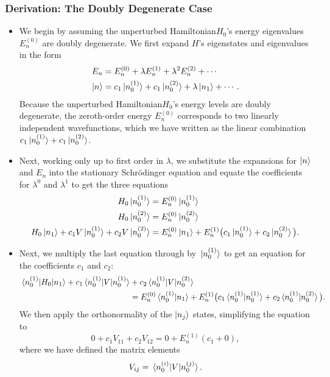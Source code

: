 \documentclass[11pt, a4paper]{article}
\newcommand{\Schro}{Schr\"{o}dinger\xspace}
\newcommand{\Ham}{Hamiltonian\xspace}
\begin{document}
\subsubsection{Derivation: The Doubly Degenerate Case}
\begin{itemize}
    \item We begin by assuming the unperturbed \Ham $ H_{0} $'s energy eigenvalues $ E_{n}^{(0)} $ are doubly degenerate. We first expand $ H $'s eigenstates and eigenvalues in the form
    \begin{align*}
        E_{n} &= E_{n}^{(0)} + \lambda E_{n}^{(1)} + \lambda^{2} E_{n}^{(2)} + \cdots\\
        \ket{n} &= c_{1}\ket*{n_{0}^{(1)}} + c_{1}\ket*{n_{0}^{(2)}} + \lambda \ket{n_{1}} +  \cdots.
    \end{align*}
    Because the unperturbed \Ham $ H_{0} $'s energy levels are doubly degenerate, the zeroth-order energy $ E_{n}^{(0)} $ corresponds to two linearly independent wavefunctions, which we have written as the linear combination $ c_{1}\ket*{n_{0}^{(1)}} + c_{1}\ket*{n_{0}^{(2)}} $. 

    \item Next, working only up to first order in $ \lambda $, we substitute the expansions for $ \ket{n} $ and $ E_{n} $ into the stationary \Schro equation and equate the coefficients for $ \lambda^{0} $ and $ \lambda^{1} $ to get the three equations
    \begin{align*}
        H_{0} \ket*{n_{0}^{(1)}} &= E_{n}^{(0)} \ket*{n_{0}^{(1)}}\\
        H_{0} \ket*{n_{0}^{(2)}} &= E_{n}^{(0)} \ket*{n_{0}^{(2)}}\\
        H_{0}\ket{n_{1}} + c_{1}V \ket*{n_{0}^{(1)}} + c_{2}V \ket*{n_{0}^{(2)}} &= E_{n}^{(0)} \ket{n_{1}} + E_{n}^{(1)} \big( c_{1}\ket*{n_{0}^{(1)}} + c_{2}\ket*{n_{0}^{(2)}} \big).
    \end{align*}
    
    \item Next, we multiply the last equation through by $ \ket*{n_{0}^{(1)}} $ to get an equation for the coefficients $ c_{1} $ and $ c_{2} $:
    \begin{align*}
        \mel*{n_{0}^{(1)}}{H_{0}}{n_{1}} + c_{1}\mel*{n_{0}^{(1)}}{V}{n_{0}^{(1)}} &+ c_{2}\mel*{n_{0}^{(1)}}{V}{n_{0}^{(2)}} \\
        & = E_{n}^{(0)} \braket*{n_{0}^{(1)}}{n_{1}} + E_{n}^{(1)}\big( c_{1}\braket*{n_{0}^{(1)}}{n_{0}^{(1)}} + c_{2} \braket*{n_{0}^{(1)}}{n_{0}^{(2)}} \big).
    \end{align*}
    We then apply the orthonormality of the $ \ket{n_{j}} $ states, simplifying the equation to
    \begin{equation*}
        0 + c_{1}V_{11} + c_{2}V_{12} = 0 + E_{n}^{(1)}(c_{1} + 0),
    \end{equation*}
    where we have defined the matrix elements
    \begin{equation*}
        V_{ij} = \mel*{n_{0}^{(i)}}{V}{n_{0}^{(j)}}.
    \end{equation*}
    

\end{itemize}
\end{document}
